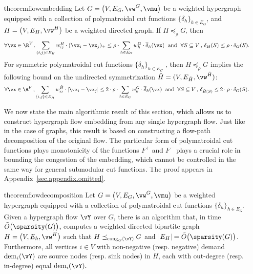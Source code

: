 \documentclass[letterpaper]{article}
\newcommand{\dem}{\operatorname{dem}}
\renewcommand{\cong}{\operatorname{cong}}
\begin{document}
\begin{restatable}{theorem}{flowembedding}
\label{thm.flow-embedding}
Let $G = \big( V, E_G, \vw^G, \vmu \big)$ be a weighted hypergraph equipped with a collection of polymatroidal cut functions $\{ \delta_h \}_{h \in E_G}$, and $H = \big( V, E_H, \vw^H \big)$ be a weighted directed graph. If $H \preceq_{\rho} G$, then
\begin{equation*}
\forall \vx \in \R^V\,,  \sum_{( i, j) \in E_H} w^H_{ij} \cdot (\vx_i - \vx_j)_{+}
\leq \rho \cdot \sum_{h \in E_G} w^G_h \cdot \overline{\delta}_h(\vx) \; \textrm{ and }\; \forall S \subseteq V\,,\, \delta_H(S) \leq \rho \cdot \delta_G(S).
\end{equation*}
For symmetric polymatroidal cut functions $\{ \delta_h \}_{h \in E_G}$ , then $H \preceq_{\rho} G$ implies the following bound on the undirected symmetrization $\tilde{H} = (V,E_{\tilde{H}}, \vw^{\tilde{H}})$:
$$
\forall \vx \in \R^V\,,  \sum_{\{i, j\} \in E_{\tilde{H}}} w^{\tilde{H}}_{ij} \cdot \lvert \vx_i - \vx_j \rvert
\leq 2 \cdot \rho \cdot \sum_{h \in E_G} w^G_h \cdot \overline{\delta}_h(\vx) \; \textrm{ and }\; \forall S \subseteq V\,,\, \delta_{\tilde{H}(S)} \leq 2 \cdot \rho \cdot \delta_G(S).
$$
\end{restatable}

We now state the main algorithmic result of this section, which allows us to construct hypergraph flow embedding from any single hypergraph flow. Just like in the case of graphs, this result is based on constructing a flow-path decomposition of the original flow. The particular form of polymatroidal cut functions plays monotonicity of the functions $F^+$ and $F^-$ plays a crucial role in bounding the congestion of the embedding, which cannot be controlled in the same way for general submodular cut functions. The proof appears in Appendix~\ref{sec.appendix.omitted}.

\begin{restatable}{theorem}{flowdecomposition}
\label{theorem.hypergraph-flow-decomposition}
Let $G = \big( V, E_G, \vw^G, \vmu \big)$ be a weighted hypergraph equipped with a collection of polymatroidal cut functions $\{ \delta_h \}_{h \in E_G}$. Given a hypergraph flow $\vY$ over $G$, there is an algorithm that, in time $\tilde{O}\big( \sparsity(G) \big)$, computes a weighted directed bipartite graph $H = \big( V, E_h, \vw^H \big)$ such that $H \preceq_{\cong_G(\vY)} G$ and $|E_H| = \tilde{O}\big( \sparsity(G) \big)$. Furthermore,
all vertices $i \in V$ with non-negative (resp. negative) demand $\dem_i(\vY)$ are source nodes (resp. sink nodes) in $H$, each with out-degree (resp. in-degree) equal $\dem_i(\vY).$
\end{restatable}
 
\end{document}
